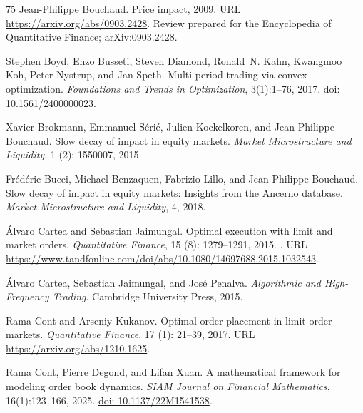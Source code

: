 \documentclass[11pt]{article}
\numberwithin{equation}{section}
\theoremstyle{definition}
\theoremstyle{remark}
\theoremstyle{definition}
\begin{document}
\begin{thebibliography}{75}
Jean-Philippe Bouchaud.
\newblock Price impact, 2009.
\newblock URL \url{https://arxiv.org/abs/0903.2428}.
\newblock Review prepared for the Encyclopedia of Quantitative Finance;
  arXiv:0903.2428.

Stephen Boyd, Enzo Busseti, Steven Diamond, Ronald~N. Kahn, Kwangmoo Koh,
  Peter Nystrup, and Jan Speth.
\newblock Multi-period trading via convex optimization.
\newblock \emph{Foundations and Trends in Optimization}, 3(1):1--76, 2017.
\newblock doi: 10.1561/2400000023.

Xavier Brokmann, Emmanuel S{\'e}ri{\'e}, Julien Kockelkoren, and Jean-Philippe
  Bouchaud.
\newblock Slow decay of impact in equity markets.
\newblock \emph{Market Microstructure and Liquidity}, 1 (2):
  1550007, 2015.

Fr{\'e}d{\'e}ric Bucci, Michael Benzaquen, Fabrizio Lillo, and Jean-Philippe
  Bouchaud.
\newblock Slow decay of impact in equity markets: Insights from the {A}ncerno
  database.
\newblock \emph{Market Microstructure and Liquidity}, 4, 2018.

{\'A}lvaro Cartea and Sebastian Jaimungal.
\newblock Optimal execution with limit and market orders.
\newblock \emph{Quantitative Finance}, 15 (8): 1279--1291,
  2015.
\newblock {}.
\newblock URL
  \url{https://www.tandfonline.com/doi/abs/10.1080/14697688.2015.1032543}.

{\'A}lvaro Cartea, Sebastian Jaimungal, and Jos{\'e} Penalva.
\newblock \emph{Algorithmic and High-Frequency Trading}.
\newblock Cambridge University Press, 2015.

Rama Cont and Arseniy Kukanov.
\newblock Optimal order placement in limit order markets.
\newblock \emph{Quantitative Finance}, 17 (1): 21--39, 2017.
\newblock URL \url{https://arxiv.org/abs/1210.1625}.

Rama Cont, Pierre Degond, and Lifan Xuan.
\newblock A mathematical framework for modeling order book dynamics.
\newblock \emph{SIAM Journal on Financial Mathematics}, 16(1):123--166, 2025.
\newblock \href{https://doi.org/10.1137/22M1541538}{doi: 10.1137/22M1541538}.


\end{thebibliography}
\end{document}
